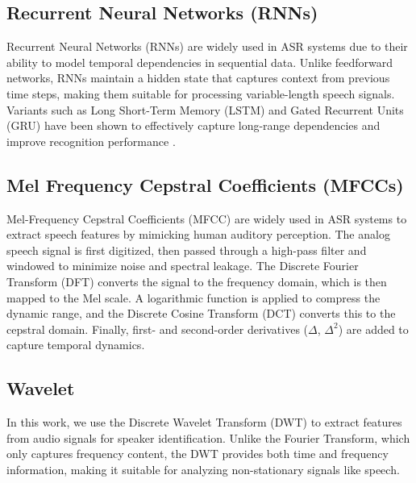 \documentclass[conference]{IEEEtran}
\begin{document}
\subsection{Recurrent Neural Networks (RNNs)}

Recurrent Neural Networks (RNNs) are widely used in ASR systems due to their ability to model temporal dependencies in sequential data. Unlike feedforward networks, RNNs maintain a hidden state that captures context from previous time steps, making them suitable for processing variable-length speech signals. Variants such as Long Short-Term Memory (LSTM) and Gated Recurrent Units (GRU) have been shown to effectively capture long-range dependencies and improve recognition performance \cite{graves2013speech}.

\subsection{Mel Frequency Cepstral Coefficients (MFCCs)}
Mel-Frequency Cepstral Coefficients (MFCC) are widely used in ASR systems to extract speech features by
mimicking human auditory perception. The analog speech signal is first digitized, then passed through a
high-pass filter and windowed to minimize noise and spectral leakage. The Discrete Fourier Transform (DFT)
converts the signal to the frequency domain, which is then mapped to the Mel scale. A logarithmic function
is applied to compress the dynamic range, and the Discrete Cosine Transform (DCT) converts this to the cepstral
domain. Finally, first- and second-order derivatives ($\Delta$, $\Delta^2$) are added to capture temporal dynamics. \cite{davis1980comparison}















\subsection{Wavelet}

In this work, we use the Discrete Wavelet Transform (DWT) to extract features
from audio signals for speaker identification. Unlike the Fourier Transform,
which only captures frequency content, the DWT provides both time and frequency information, making it suitable for analyzing non-stationary signals like speech.
\end{document}
